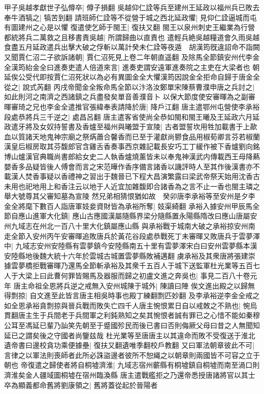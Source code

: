 甲子吳越孝獻世子弘僔卒|{
	僔子損翻}
吳越仰仁詮等兵至建州王延政以福州兵已敗去奉牛酒犒之|{
	犒苦到翻}
請班師仁詮等不從營于城之西北延政懼|{
	見仰仁詮逼城而屯有圖建州之心是以懼}
復遣使乞師于閩王|{
	復扶又翻}
閩王以泉州刺史王繼業為行營都統將兵二萬救之且移書責吳越|{
	所謂歸曲以直責也}
遣輕兵絶吳越糧道會久雨吳越食盡五月延政遣兵出擊大破之俘斬以萬計癸未仁詮等夜遁　胡漢筠旣違詔命不詣闕又聞賈仁沼二子欲訴諸朝|{
	賈仁沼死見上卷二年朝直遥翻}
及除馬全節鎮安州代李金全漢筠紿金全曰進奏吏遣人倍道來言|{
	進奏吏謂安遠軍進奏院之主吏在大梁者也}
朝延俟公受代即按賈仁沼死狀以為必有異圖金全大懼漢筠因說金全拒命自歸于唐金全從之|{
	說式芮翻}
丙戌帝聞金全叛命馬全節以汴洛汝鄭單宋陳蔡曹濮申唐之兵討之|{
	如此則河之南濟之西諸鎮之兵盡發矣單音善濮音卜}
以保大節度使安審暉為之副審暉審琦之兄也李金全遣推官張緯奉表請降於唐|{
	降戶江翻}
唐主遣鄂州屯營使李承裕段處恭將兵三千逆之|{
	處昌呂翻}
唐主遣客省使尚全恭如閩和閩王曦及王延政六月延政遣牙將及女奴持誓書及香爐至福州與曦盟于宣陵|{
	古者盟誓坎用牲加載書于上歃血以質諸天地鬼神宗廟之祭焫蕭合馨香而已至于灌獻尚鬰食品用椒荀卿言芬若椒蘭漢皇后椒房取其芬馥郎官含雞舌香奏事西京雜記載長安巧工丁緩作被下香爐劉向銘博山爐漢官典職尚書郎給女史二人執香爐燒薰皆未以奉鬼神漢武内傳載西王母降爇嬰香多品疑皆後人傅會而言之宋范曄作香序備言諸香以譏評時人至其作後漢書亦不載漢人焚香事疑以香禮神之習出于魏晉已下程大昌演繁露曰梁武帝祭天始用沈香古未用也祀地用上和香注云以地于人近宜加雜馥即合諸香為之言不止一香也閩主璘之舉大號尊其父審知墓為宣陵}
然兄弟相猜恨猶如故　癸卯唐李承裕等至安州是夕李金全將麾下數百人詣唐軍妓妾資財皆為承裕所奪|{
	妓渠綺翻}
承裕入據安州甲辰馬全節自應山進軍大化鎮|{
	應山古應國漢屬隨縣界梁分隨縣置永陽縣隋改曰應山唐屬安州九域志在州北一百八十里大化鎮屬應山縣}
與承裕戰于城南大破之承裕掠安州南走全節入安州丙午安審暉追敗唐兵於黃花谷段處恭戰死丁未審暉又敗唐兵于雲夢澤中|{
	九域志安州安陸縣有雲夢鎮今安陸縣南五十里有雲夢澤宋白曰安州雲夢縣本漢安陸縣地後魏大統十六年於雲城古城置雲夢縣敗補邁翻}
虜承裕及其衆唐將張建崇據雲夢橋拒戰審暉乃還馬全節斬承裕及其衆千五百人于城下送監軍杜光業等五百七人于大梁上曰此曹何罪皆賜馬及器服而歸之初盧文進之奔吳也|{
	事見二百八十卷元年}
唐主命祖全恩將兵逆之戒無入安州城陳于城外|{
	陳讀曰陣}
俟文進出殿之以歸無得剽掠|{
	自文進至此皆言唐主相吳時事也殿丁練翻剽匹妙翻}
及李承裕逆李金全戒之如全恩承裕貪剽掠與晉兵戰而敗失亡四千人唐主惋恨累日自以戒敇之不熟也|{
	惋烏貫翻唐主生于兵間老于兵間軍之利鈍熟知之矣其惋恨者誠有罪已之心惜不能如秦穆公耳至馮延已輩乃訕笑先朝至于蹙國殄民而後已書曰否則侮厥父母曰昔之人無聞知延已之謂矣後之守國者尚鑒兹哉}
杜光業等至唐唐主以其違命而敗不受復送于淮北遺帝書曰邊校貪功乘便據壘|{
	復扶又翻遺唯季翻校戶教翻}
又曰軍法朝章彼此不可|{
	言律之以軍法則喪師者此所必誅盜邊者彼所不恕䋲之以朝章則兩國皆不可容之立于朝也}
帝復遣之歸使者將自桐墟濟淮|{
	九域志宿州蘄縣有桐墟鎮自桐墟而南至渦口則濟淮矣金人疆域圖桐墟在宿州臨渙縣}
唐主遣戰艦拒之乃還帝悉授唐諸將官以其士卒為顯義都命舊將劉康領之|{
	舊將蓋從起於晉陽者}


